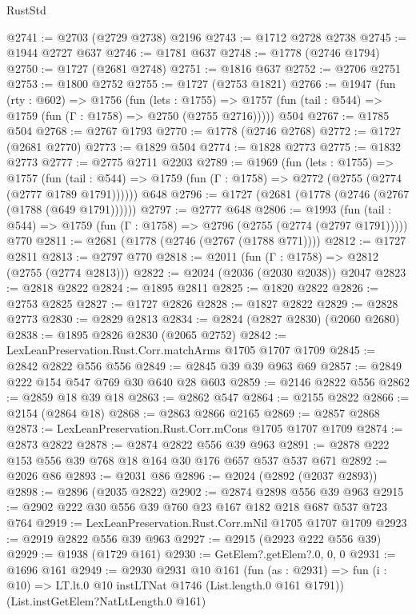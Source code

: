 \begin{lexlean}{RustStd}
\begin{coremodule}
@2741 := @2703 (@2729 @2738) @2196
@2743 := @1712 @2728 @2738
@2745 := @1944 @2727 @637
@2746 := @1781 @637
@2748 := @1778 (@2746 @1794)
@2750 := @1727 (@2681 @2748)
@2751 := @1816 @637
@2752 := @2706 @2751
@2753 := @1800 @2752
@2755 := @1727 (@2753 @1821)
@2766 := @1947
    (fun (rty : @602) =>
    @1756
      (fun (lets : @1755) =>
      @1757 (fun (tail : @544) => @1759 (fun (Γ : @1758) => @2750 (@2755 @2716)))))
    @504
@2767 := @1785 @504
@2768 := @2767 @1793
@2770 := @1778 (@2746 @2768)
@2772 := @1727 (@2681 @2770)
@2773 := @1829 @504
@2774 := @1828 @2773
@2775 := @1832 @2773
@2777 := @2775 @2711 @2203
@2789 := @1969
    (fun (lets : @1755) =>
    @1757
      (fun (tail : @544) => @1759 (fun (Γ : @1758) => @2772 (@2755 (@2774 (@2777 @1789 @1791))))))
    @648
@2796 := @1727 (@2681 (@1778 (@2746 (@2767 (@1788 (@649 @1791))))))
@2797 := @2777 @648
@2806 := @1993
    (fun (tail : @544) => @1759 (fun (Γ : @1758) => @2796 (@2755 (@2774 (@2797 @1791)))))
    @770
@2811 := @2681 (@1778 (@2746 (@2767 (@1788 @771))))
@2812 := @1727 @2811
@2813 := @2797 @770
@2818 := @2011 (fun (Γ : @1758) => @2812 (@2755 (@2774 @2813)))
@2822 := @2024 (@2036 (@2030 @2038)) @2047
@2823 := @2818 @2822
@2824 := @1895 @2811
@2825 := @1820 @2822
@2826 := @2753 @2825
@2827 := @1727 @2826
@2828 := @1827 @2822
@2829 := @2828 @2773
@2830 := @2829 @2813
@2834 := @2824 (@2827 @2830) (@2060 @2680)
@2838 := @1895 @2826 @2830 (@2065 @2752)
@2842 := LexLeanPreservation.Rust.Corr.matchArms @1705 @1707 @1709
@2845 := @2842 @2822 @556 @556
@2849 := @2845 @39 @39 @963 @69
@2857 := @2849 @222 @154 @547 @769 @30 @640 @28 @603
@2859 := @2146 @2822 @556
@2862 := @2859 @18 @39 @18
@2863 := @2862 @547
@2864 := @2155 @2822
@2866 := @2154 (@2864 @18)
@2868 := @2863 @2866 @2165
@2869 := @2857 @2868
@2873 := LexLeanPreservation.Rust.Corr.mCons @1705 @1707 @1709
@2874 := @2873 @2822
@2878 := @2874 @2822 @556 @39 @963
@2891 := @2878 @222 @153 @556 @39 @768 @18 @164 @30 @176 @657 @537 @537 @671
@2892 := @2026 @86
@2893 := @2031 @86
@2896 := @2024 (@2892 (@2037 @2893))
@2898 := @2896 (@2035 @2822)
@2902 := @2874 @2898 @556 @39 @963
@2915 := @2902 @222 @30 @556 @39 @760 @23 @167 @182 @218 @687 @537 @723 @764
@2919 := LexLeanPreservation.Rust.Corr.mNil @1705 @1707 @1709
@2923 := @2919 @2822 @556 @39 @963
@2927 := @2915 (@2923 @222 @556 @39)
@2929 := @1938 (@1729 @161)
@2930 := GetElem?.getElem?.{0, 0, 0}
@2931 := @1696 @161
@2949 := @2930
    @2931
    @10
    @161
    (fun (as : @2931) =>
    fun (i : @10) => LT.lt.{0} @10 instLTNat @1746 (List.length.{0} @161 @1791))
    (List.instGetElem?NatLtLength.{0} @161)

\end{coremodule}
\end{lexlean}
